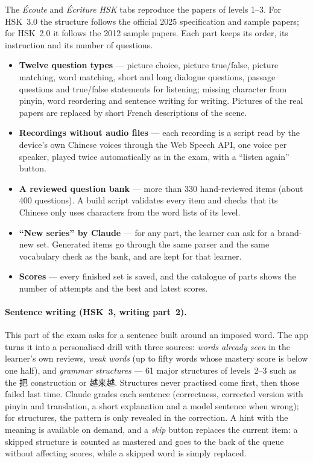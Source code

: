\documentclass[11pt,a4paper]{article}
\newcommand{\han}[1]{{#1}}
\begin{document}
The \emph{Écoute} and \emph{Écriture HSK} tabs reproduce the papers of levels
1--3. For HSK~3.0 the structure follows the official 2025 specification and
sample papers; for HSK~2.0 it follows the 2012 sample papers. Each part keeps
its order, its instruction and its number of questions.

\begin{itemize}
  \item \textbf{Twelve question types} --- picture choice, picture true/false,
        picture matching, word matching, short and long dialogue questions,
        passage questions and true/false statements for listening; missing
        character from pinyin, word reordering and sentence writing for
        writing. Pictures of the real papers are replaced by short French
        descriptions of the scene.
  \item \textbf{Recordings without audio files} --- each recording is a script
        read by the device's own Chinese voices through the Web Speech API, one
        voice per speaker, played twice automatically as in the exam, with a
        ``listen again'' button.
  \item \textbf{A reviewed question bank} --- more than 330 hand-reviewed items
        (about 400 questions). A build script validates every item and checks
        that its Chinese only uses characters from the word lists of its level.
  \item \textbf{``New series'' by Claude} --- for any part, the learner can ask
        for a brand-new set. Generated items go through the same parser and the
        same vocabulary check as the bank, and are kept for that learner.
  \item \textbf{Scores} --- every finished set is saved, and the catalogue of
        parts shows the number of attempts and the best and latest scores.
\end{itemize}

\paragraph{Sentence writing (HSK~3, writing part~2).} This part of the exam
asks for a sentence built around an imposed word. The app turns it into a
personalised drill with three sources: \emph{words already seen} in the
learner's own reviews, \emph{weak words} (up to fifty words whose mastery score
is below one half), and \emph{grammar structures} --- 61 major structures of
levels~2--3 such as the \han{把} construction or \han{越来越}. Structures never
practised come first, then those failed last time. Claude grades each sentence
(correctness, corrected version with pinyin and translation, a short
explanation and a model sentence when wrong); for structures, the pattern is
only revealed in the correction. A hint with the meaning is available on
demand, and a \emph{skip} button replaces the current item: a skipped structure
is counted as mastered and goes to the back of the queue without affecting
scores, while a skipped word is simply replaced.
\end{document}
